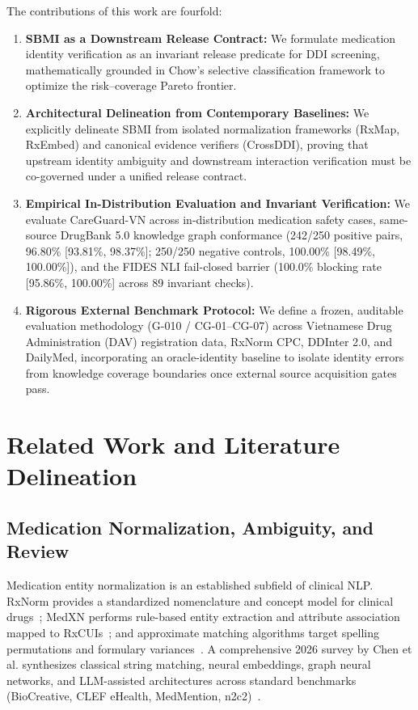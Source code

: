 \documentclass[11pt]{article}
\begin{document}
The contributions of this work are fourfold:
\begin{enumerate}[leftmargin=*]
  \item \textbf{SBMI as a Downstream Release Contract:} We formulate medication identity verification as an invariant release predicate for DDI screening, mathematically grounded in Chow's selective classification framework to optimize the risk--coverage Pareto frontier.
  \item \textbf{Architectural Delineation from Contemporary Baselines:} We explicitly delineate SBMI from isolated normalization frameworks (RxMap, RxEmbed) and canonical evidence verifiers (CrossDDI), proving that upstream identity ambiguity and downstream interaction verification must be co-governed under a unified release contract.
  \item \textbf{Empirical In-Distribution Evaluation and Invariant Verification:} We evaluate CareGuard-VN across in-distribution medication safety cases, same-source DrugBank 5.0 knowledge graph conformance (242/250 positive pairs, 96.80\% [93.81\%, 98.37\%]; 250/250 negative controls, 100.00\% [98.49\%, 100.00\%]), and the FIDES NLI fail-closed barrier (100.0\% blocking rate [95.86\%, 100.00\%] across 89 invariant checks).
  \item \textbf{Rigorous External Benchmark Protocol:} We define a frozen, auditable evaluation methodology (G-010 / CG-01--CG-07) across Vietnamese Drug Administration (DAV) registration data, RxNorm CPC, DDInter 2.0, and DailyMed, incorporating an oracle-identity baseline to isolate identity errors from knowledge coverage boundaries once external source acquisition gates pass.
\end{enumerate}

\section{Related Work and Literature Delineation}

\subsection{Medication Normalization, Ambiguity, and Review}
Medication entity normalization is an established subfield of clinical NLP. RxNorm provides a standardized nomenclature and concept model for clinical drugs~\cite{nelson2011rxnorm}; MedXN performs rule-based entity extraction and attribute association mapped to RxCUIs~\cite{sohn2014medxn}; and approximate matching algorithms target spelling permutations and formulary variances~\cite{peters2011approx}. A comprehensive 2026 survey by Chen et al. synthesizes classical string matching, neural embeddings, graph neural networks, and LLM-assisted architectures across standard benchmarks (BioCreative, CLEF eHealth, MedMention, n2c2)~\cite{chen2026mcnsurvey,luo2020n2c2}.
\end{document}
